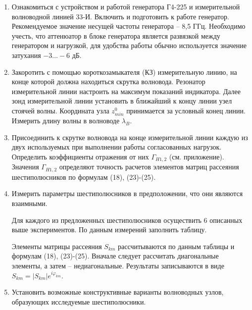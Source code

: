 ﻿\documentclass[a4paper,11pt]{article}
\begin{document}
\begin{enumerate}
	\item Ознакомиться с устройством и работой генератора Г4-225 и измерительной волноводной линией 33-И. Включить и подготовить к работе генератор. Рекомендуемое значение несущей частоты генератора -- 8,5 ГГц. Необходимо учесть, что аттенюатор в блоке генератора является развязкой между генератором и нагрузкой, для удобства работы обычно используется значение затухания $-3\ldots-6$ дБ.
	\item Закоротить с помощью короткозамыкателя (КЗ) измерительную линию, на конце которой должна находиться скрутка волновода. Резонатор измерительной линии настроить на максимум показаний индикатора. Далее зонд измерительной линии установить в ближайший к концу линии узел стоячей волны. Координата узла $z^0_{min}$ принимается за условный конец линии. Измерить длину волны в волноводе $\lambda_B$.
	\item Присоединить к скрутке волновода на конце измерительной линии каждую из двух используемых при выполнении работы согласованных нагрузок. Определить коэффициенты отражения от них $\Gamma_{H1,2}$ (см. приложение). Значения  $\Gamma_{H1,2}$ определяют точность расчетов элементов матриц рассеяния шестиполюсников по формулам (18), (23)-(25).
	\item Измерить параметры шестиполюсников в предположении, что они являются взаимными. 

	Для каждого из предложенных шестиполюсников осуществить 6 описанных выше экспериментов. По данным измерений заполнить таблицу.

	Элементы матрицы рассеяния $S_{km}$ рассчитываются по данным таблицы и формулам (18), (23)-(25). Вначале следует рассчитать диагональные элементы, а затем -- недиагональные. Результаты записываются в виде $S _ { k m } = \left| S _ { k m } \right| e ^ { i \varphi _ { k m } }$.
	\item Установить возможные конструктивные варианты волноводных узлов, образующих исследуемые шестиполюсники.
\end{enumerate}



\end{document}
